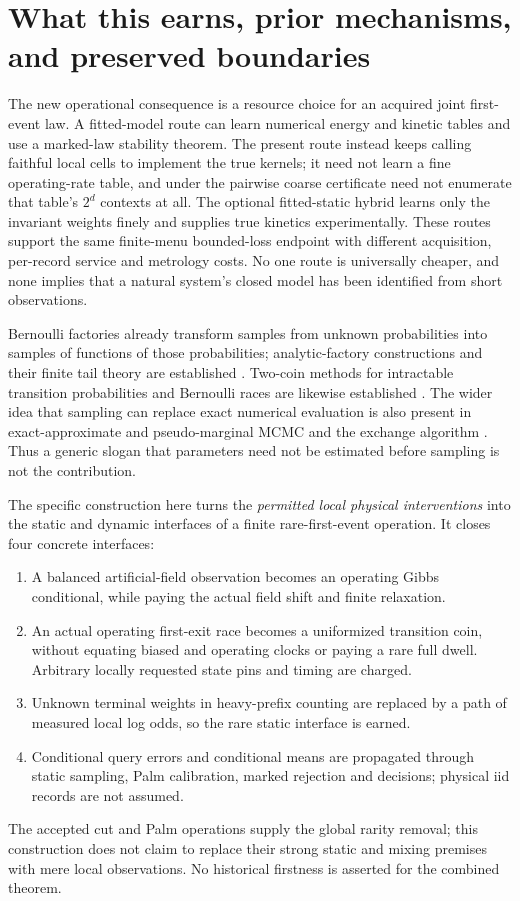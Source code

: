 \section{What this earns, prior mechanisms, and preserved boundaries}

The new operational consequence is a resource choice for an acquired joint
first-event law. A fitted-model route can learn numerical energy and
kinetic tables and use a marked-law stability theorem. The present route
instead keeps calling faithful local cells to implement the true kernels;
it need not learn a fine operating-rate table, and under the pairwise
coarse certificate need not enumerate that table's $2^d$ contexts at all.
The optional fitted-static hybrid learns only the invariant weights
finely and supplies true kinetics experimentally. These routes support
the same finite-menu bounded-loss endpoint with different acquisition,
per-record service and metrology costs. No one route is universally
cheaper, and none implies that a natural system's closed model has been
identified from short observations.

Bernoulli factories already transform samples from unknown probabilities
into samples of functions of those probabilities; analytic-factory
constructions and their finite tail theory are established
\cite{nacuperes}. Two-coin methods for intractable transition probabilities
and Bernoulli races are likewise established \cite{barker,bernoullirace}.
The wider idea that sampling can replace exact numerical evaluation is
also present in exact-approximate and pseudo-marginal MCMC
\cite{pseudo} and the exchange algorithm \cite{exchange}.
Thus a generic slogan that parameters need not be estimated before
sampling is not the contribution.

The specific construction here turns the \emph{permitted local physical
interventions} into the static and dynamic interfaces of a finite
rare-first-event operation. It closes four concrete interfaces:
\begin{enumerate}
\item A balanced artificial-field observation becomes an operating Gibbs
conditional, while paying the actual field shift and finite relaxation.
\item An actual operating first-exit race becomes a uniformized transition
coin, without equating biased and operating clocks or paying a rare full
dwell. Arbitrary locally requested state pins and timing are charged.
\item Unknown terminal weights in heavy-prefix counting are replaced by
a path of measured local log odds, so the rare static interface is earned.
\item Conditional query errors and conditional means are propagated
through static sampling, Palm calibration, marked rejection and decisions;
physical iid records are not assumed.
\end{enumerate}
The accepted cut and Palm operations supply the global rarity removal;
this construction does not claim to replace their strong static and
mixing premises with mere local observations.
No historical firstness is asserted for the combined theorem.

